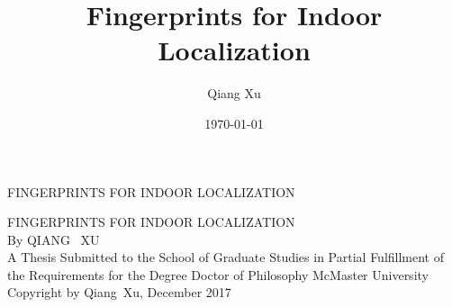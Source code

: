 \documentclass[letterpaper,12pt,twoside,openright]{report} %
\title{Fingerprints for Indoor Localization}
\author{Qiang Xu}
\date{\today}
\begin{document}
\begin{titlepage} %
    \thispagestyle{empty}
    \vspace*{\fill}
    \begin{center}{\Large
    \uppercase{Fingerprints for Indoor Localization}}
    \end{center}
    \vspace*{\fill}
    \setcounter{page}{0} %
\end{titlepage}

\begin{titlepage} %
\thispagestyle{empty}
\centering
\vspace*{\fill} %
{\Large \uppercase{Fingerprints for Indoor Localization}\\
\vfill
By QIANG \ XU\\}
\vfill
A Thesis Submitted to the School of Graduate Studies in Partial Fulfillment of
the Requirements for the Degree Doctor of Philosophy
\vfill%
McMaster University \textcopyright{} Copyright by Qiang\ Xu, December 2017
\end{titlepage}
\end{document}
